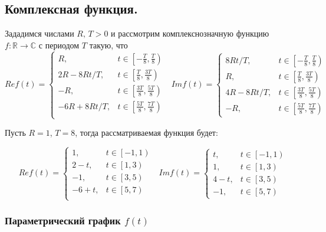 \documentclass[a5paper, 10pt]{article}
\theoremstyle{definition}
\theoremstyle{plain}
\theoremstyle{remark}
\begin{document}
\subsection{Комплексная функция.}
Зададимся числами $R, \, T > 0$ и рассмотрим комплекснозначную функцию $f : \mathbb{R} \to \mathbb{C}$ с периодом $T$ такую, что
\begin{equation}
Re f(t) =
\begin{cases}
R, & t \in \left[ -\frac{T}{8}, \frac{T}{8} \right)\\
2R - 8Rt / T, &  t \in \left[ \frac{T}{8}, \frac{3T}{8} \right)\\
-R, & t \in \left[ \frac{3T}{8}, \frac{5T}{8} \right)\\
-6R + 8Rt / T, &  t \in \left[ \frac{5T}{8}, \frac{7T}{8} \right)\\
\end{cases}
\,\,\,\,
Im f(t) =
\begin{cases}
8Rt / T, & t \in \left[ -\frac{T}{8}, \frac{T}{8} \right)\\
R, &  t \in \left[ \frac{T}{8}, \frac{3T}{8} \right)\\
4R - 8Rt / T, & t \in \left[ \frac{3T}{8}, \frac{5T}{8} \right)\\
- R, &  t \in \left[ \frac{5T}{8}, \frac{7T}{8} \right)
\end{cases}
\end{equation}


Пусть $R=1$, $T=8$, тогда рассматриваемая функция будет:

\begin{equation}
Re f(t) =
\begin{cases}
1, & t \in \left[ -1, 1 \right)\\
2 - t, &  t \in \left[ 1, 3 \right)\\
-1, & t \in \left[ 3, 5 \right)\\
-6 + t, &  t \in \left[ 5, 7 \right)\\
\end{cases}
\,\,\,\,
Im f(t) =
\begin{cases}
t, & t \in \left[ -1, 1 \right)\\
1, &  t \in \left[ 1, 3 \right)\\
4 - t , & t \in \left[ 3, 5 \right)\\
- 1, &  t \in \left[ 5, 7 \right)
\end{cases}
\end{equation}

\subsubsection{Параметрический график $f(t)$}
\end{document}
